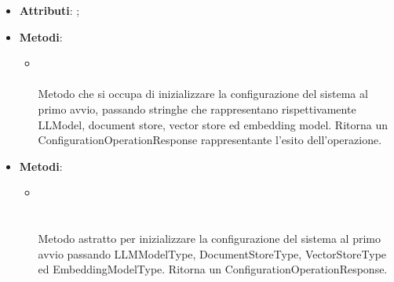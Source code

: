 \documentclass[10pt, a4paper]{article}
\begin{document}
\label{SetConfigurationControllerDettaglio}
\begin{itemize}
    \item \textbf{Attributi}: ;
    \item \textbf{Metodi}:
    \begin{itemize}
        \item {}\\\\
        Metodo che si occupa di inizializzare la configurazione del sistema al primo avvio, passando stringhe che rappresentano rispettivamente LLModel, document store, vector store ed embedding model. Ritorna un ConfigurationOperationResponse rappresentante l'esito dell'operazione.
    \end{itemize}
\end{itemize}

\label{SetConfigurationPortDettaglio}
\begin{itemize}
    \item \textbf{Metodi}:
    \begin{itemize}
        \item {}\\ \\ \\
        Metodo astratto per inizializzare la configurazione del sistema al primo avvio passando LLMModelType, DocumentStoreType, VectorStoreType ed EmbeddingModelType. Ritorna un ConfigurationOperationResponse.
    \end{itemize}
\end{itemize}
\end{document}
